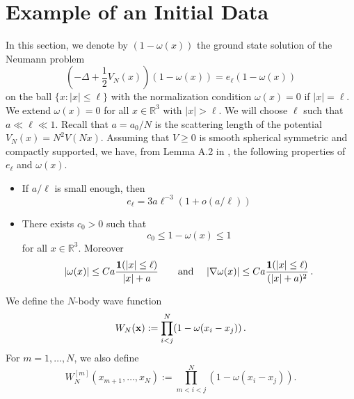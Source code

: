 \documentclass[11pt]{article}
\newcommand{\bx}{{\bf x}}
\newcommand{\bR}{{\mathbb R}}
\begin{document}
\section{Example of an Initial Data}\label{sec:W}
\setcounter{equation}{0}

In this section, we denote by $(1-\omega (x))$ the ground state
solution of the Neumann problem
\[ \left( - \Delta + \frac{1}{2} V_N (x)\right) (1-\omega(x)) =
e_{\ell} (1-\omega (x)) \] on the ball $\{ x : |x| \leq \ell \}$
with the normalization condition $\omega (x) =0$ if $|x| = \ell$. We
extend $\omega (x) =0$ for all $x \in\bR^3$ with $|x| > \ell$. We
will choose $\ell$ such that $a \ll \ell \ll 1$. Recall that $a=a_0
/N$ is the scattering length of the potential $V_N (x) = N^2 V
(Nx)$. Assuming that $V \geq 0$ is smooth spherical symmetric and
compactly supported, we have, from Lemma A.2 in \cite{ESY}, the
following properties of $e_{\ell}$ and $\omega (x)$.
\begin{itemize}
\item[i)] If $a/\ell$ is small enough, then
\begin{equation}\label{eq:eell}
e_{\ell} = 3a \ell^{-3} (1+ o (a/\ell)) \end{equation}
\item[ii)] There exists $c_0 >0$ such that
\[ c_0 \leq 1-\omega (x) \leq 1\] for all $x \in \bR^3$. Moreover
\begin{equation}\label{eq:ome} |\omega (x)| \leq Ca \frac{{\bf 1}(|x| \leq \ell)}{|x|+ a}
\qquad \text{and } \quad |\nabla \omega (x)| \leq C a \frac{{\bf 1}
(|x| \leq \ell)}{(|x| + a)^2} \,. \end{equation}
\end{itemize}
We define the $N$-body wave function \[ W_N (\bx) := \prod_{i<j}^N
(1-\omega (x_i -x_j))\,. \] For $m =1,\dots ,N$, we also define
\[ W_N^{[m]} (x_{m+1}, \dots , x_N) := \prod_{m<i<j}^N (1-\omega (x_i
-x_j)). \]
\end{document}
